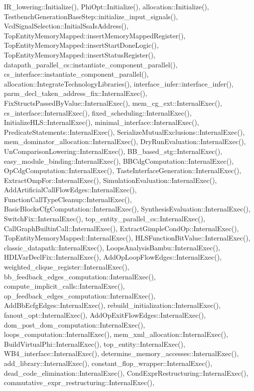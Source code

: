 I\+R\+\_\+lowering\+::\+Initialize(), Phi\+Opt\+::\+Initialize(), allocation\+::\+Initialize(), Testbench\+Generation\+Base\+Step\+::initialize\+\_\+input\+\_\+signals(), Vcd\+Signal\+Selection\+::\+Initial\+Ssa\+Is\+Address(), Top\+Entity\+Memory\+Mapped\+::insert\+Memory\+Mapped\+Register(), Top\+Entity\+Memory\+Mapped\+::insert\+Start\+Done\+Logic(), Top\+Entity\+Memory\+Mapped\+::insert\+Status\+Register(), datapath\+\_\+parallel\+\_\+cs\+::instantiate\+\_\+component\+\_\+parallel(), cs\+\_\+interface\+::instantiate\+\_\+component\+\_\+parallel(), allocation\+::\+Integrate\+Technology\+Libraries(), interface\+\_\+infer\+::interface\+\_\+infer(), parm\+\_\+decl\+\_\+taken\+\_\+address\+\_\+fix\+::\+Internal\+Exec(), Fix\+Structs\+Passed\+By\+Value\+::\+Internal\+Exec(), mem\+\_\+cg\+\_\+ext\+::\+Internal\+Exec(), cs\+\_\+interface\+::\+Internal\+Exec(), fixed\+\_\+scheduling\+::\+Internal\+Exec(), Initialize\+H\+L\+S\+::\+Internal\+Exec(), minimal\+\_\+interface\+::\+Internal\+Exec(), Predicate\+Statements\+::\+Internal\+Exec(), Serialize\+Mutual\+Exclusions\+::\+Internal\+Exec(), mem\+\_\+dominator\+\_\+allocation\+::\+Internal\+Exec(), Dry\+Run\+Evaluation\+::\+Internal\+Exec(), Un\+Comparison\+Lowering\+::\+Internal\+Exec(), B\+B\+\_\+based\+\_\+stg\+::\+Internal\+Exec(), easy\+\_\+module\+\_\+binding\+::\+Internal\+Exec(), B\+B\+Cdg\+Computation\+::\+Internal\+Exec(), Op\+Cdg\+Computation\+::\+Internal\+Exec(), Taste\+Interface\+Generation\+::\+Internal\+Exec(), Extract\+Omp\+For\+::\+Internal\+Exec(), Simulation\+Evaluation\+::\+Internal\+Exec(), Add\+Artificial\+Call\+Flow\+Edges\+::\+Internal\+Exec(), Function\+Call\+Type\+Cleanup\+::\+Internal\+Exec(), Basic\+Blocks\+Cfg\+Computation\+::\+Internal\+Exec(), Synthesis\+Evaluation\+::\+Internal\+Exec(), Switch\+Fix\+::\+Internal\+Exec(), top\+\_\+entity\+\_\+parallel\+\_\+cs\+::\+Internal\+Exec(), Call\+Graph\+Builtin\+Call\+::\+Internal\+Exec(), Extract\+Gimple\+Cond\+Op\+::\+Internal\+Exec(), Top\+Entity\+Memory\+Mapped\+::\+Internal\+Exec(), H\+L\+S\+Function\+Bit\+Value\+::\+Internal\+Exec(), classic\+\_\+datapath\+::\+Internal\+Exec(), Loops\+Analysis\+Bambu\+::\+Internal\+Exec(), H\+D\+L\+Var\+Decl\+Fix\+::\+Internal\+Exec(), Add\+Op\+Loop\+Flow\+Edges\+::\+Internal\+Exec(), weighted\+\_\+clique\+\_\+register\+::\+Internal\+Exec(), bb\+\_\+feedback\+\_\+edges\+\_\+computation\+::\+Internal\+Exec(), compute\+\_\+implicit\+\_\+calls\+::\+Internal\+Exec(), op\+\_\+feedback\+\_\+edges\+\_\+computation\+::\+Internal\+Exec(), Add\+Bb\+Ecfg\+Edges\+::\+Internal\+Exec(), rebuild\+\_\+initialization\+::\+Internal\+Exec(), fanout\+\_\+opt\+::\+Internal\+Exec(), Add\+Op\+Exit\+Flow\+Edges\+::\+Internal\+Exec(), dom\+\_\+post\+\_\+dom\+\_\+computation\+::\+Internal\+Exec(), loops\+\_\+computation\+::\+Internal\+Exec(), mem\+\_\+xml\+\_\+allocation\+::\+Internal\+Exec(), Build\+Virtual\+Phi\+::\+Internal\+Exec(), top\+\_\+entity\+::\+Internal\+Exec(), W\+B4\+\_\+interface\+::\+Internal\+Exec(), determine\+\_\+memory\+\_\+accesses\+::\+Internal\+Exec(), add\+\_\+library\+::\+Internal\+Exec(), constant\+\_\+flop\+\_\+wrapper\+::\+Internal\+Exec(), dead\+\_\+code\+\_\+elimination\+::\+Internal\+Exec(), Cond\+Expr\+Restructuring\+::\+Internal\+Exec(), commutative\+\_\+expr\+\_\+restructuring\+::\+Internal\+Exec(), 